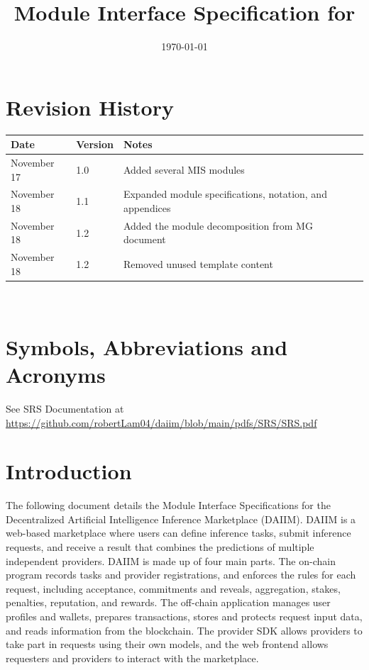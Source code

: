 \documentclass[12pt, titlepage]{article}
\begin{document}
\title{Module Interface Specification for \progname{}}

\author{\authname}

\date{\today}

\maketitle


\section{Revision History}

\begin{tabularx}{\textwidth}{p{3cm}p{2cm}X}
\toprule {\bf Date} & {\bf Version} & {\bf Notes}\\
\midrule
November 17 & 1.0 & Added several MIS modules\\
November 18 & 1.1 & Expanded module specifications, notation, and appendices\\
November 18 & 1.2 & Added the module decomposition from MG document\\
November 18 & 1.2 & Removed unused template content\\
\bottomrule
\end{tabularx}

~\newpage

\section{Symbols, Abbreviations and Acronyms}

See SRS Documentation at \url{https://github.com/robertLam04/daiim/blob/main/pdfs/SRS/SRS.pdf}

\newpage

\tableofcontents

\newpage


\section{Introduction}

The following document details the Module Interface Specifications for the Decentralized Artificial Intelligence Inference Marketplace (DAIIM).
DAIIM is a web-based marketplace where users can define inference tasks, submit
inference requests, and receive a result that combines the predictions of
multiple independent providers. DAIIM is made up of four main parts. The
on-chain program records tasks and provider registrations, and enforces the
rules for each request, including acceptance, commitments and reveals,
aggregation, stakes, penalties, reputation, and rewards. The off-chain
application manages user profiles and wallets, prepares transactions, stores
and protects request input data, and reads information from the blockchain.
The provider SDK allows providers to take part in requests using their own
models, and the web frontend allows requesters and providers to interact with
the marketplace.
\end{document}

